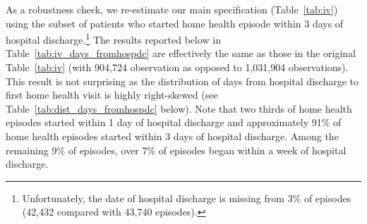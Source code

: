 \documentclass[final,12pt, notitlepage]{article}
\begin{document}
\begin{singlespace}
As a robustness check, we re-estimate our main specification (Table~\ref{tab:iv}) using the subset of patients who started home health episode within 3 days of hospital discharge.\footnote{Unfortunately, the date of hospital discharge is missing from 3\% of episodes (42,432 compared with 43,740 episodes).} The results reported below in Table~\ref{tab:iv_days_fromhospdc} are effectively the same as those in the original Table~\ref{tab:iv} (with 904,724 observation as opposed to 1,031,904 observations). This result is not surprising as the distribution of days from hospital discharge to first home health visit is highly right-skewed (see Table~\ref{tab:dist_days_fromhospdc} below). Note that two thirds of home health episodes started within 1 day of hospital discharge and approximately 91\% of home health episodes started within 3 days of hospital discharge. Among the remaining 9\% of episodes, over 7\% of episodes began within a week of hospital discharge.
%




\end{singlespace}
\end{document}
